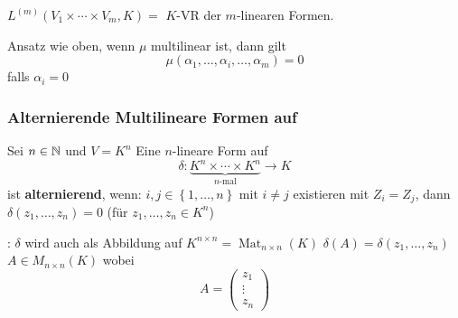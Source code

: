 \begin{subdefinition*}[Notation]
	$ L^{(m)} \left( V_1 \times \dotsb \times V_m, K \right) = $ $ K $-VR der $ m $-linearen Formen.
\end{subdefinition*}

\begin{subnote}
	Ansatz wie oben, wenn $ \mu $ multilinear ist, dann gilt
	\[
		\mu(\alpha_1, \dotsc, \alpha_i, \dotsc, \alpha_m) = 0
	\]
	falls $ \alpha_i = 0 $
\end{subnote}

\subsubsection{Alternierende Multilineare Formen auf }

\begin{subdefinition}
	Sei $ n \in \mathbb{N}  $ und $ V = K^n $ Eine $ n $-lineare Form auf
	\[
		\delta : \underbrace{K^n \times  \dotsb \times K^n}_{n\text{-mal} } \to K
	\]
	ist \textbf{alternierend}, wenn: $ i, j \in \left\{ 1, \dotsc, n \right\}  $ mit $ i \neq j $ existieren mit $ Z_i = Z_j $, dann $ \delta(z_1, \dotsc, z_n) = 0 $ (für $ z_1, \dotsc, z_n \in K^n $)
\end{subdefinition}

\begin{subdefinition*}[Konvention]:
	$ \delta $ wird auch als Abbildung auf $ K^{n \times n} = \operatorname{Mat}_{n \times n} (K) $ $ \delta(A) = \delta(z_1, \dotsc, z_{n} ) $\\
	$ A \in M_{n \times n} (K) $ wobei
	\[
		A = \begin{pmatrix} z_1 \\ \vdots \\ z_n \end{pmatrix} 
	\]
\end{subdefinition*}

